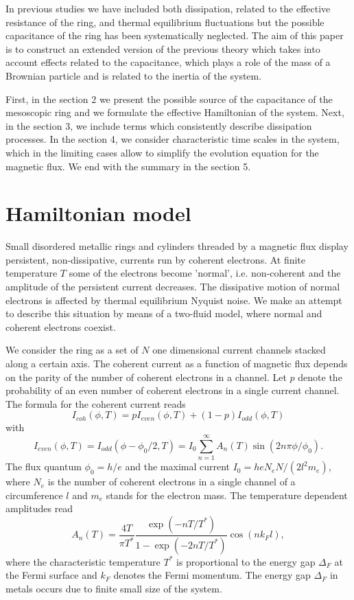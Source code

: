 \documentclass[a4paper,final]{appolb}
\begin{document}
In  previous studies we have included both dissipation, related to the 
effective resistance of 
the ring, and thermal equilibrium  fluctuations but the possible 
capacitance of the ring has been  
systematically neglected. 
The aim of this paper is to construct an extended version of the previous theory which takes into account  effects related to the capacitance, which  
plays a role of the mass of a Brownian particle  
and  is related to the inertia of the system.     

First, in the section 2 we present the possible source of the capacitance 
of the mesoscopic ring and we formulate the effective  Hamiltonian of 
the system.  
Next, in the section 3, we  include terms which consistently describe dissipation processes.  
In the section 4, we consider characteristic time scales in the system, which  in the  limiting 
cases allow to simplify the evolution equation for the magnetic flux.    
We end with the summary in the section 5. 


\section{Hamiltonian model}  

Small disordered metallic rings and cylinders threaded by a magnetic flux 
display persistent, non-dissipative,  currents run by coherent
electrons. At  finite temperature $T$ some of the electrons
become 'normal', i.e. non-coherent and the amplitude of the
persistent current decreases. The
dissipative motion of normal electrons is affected by  thermal
equilibrium Nyquist noise.
We make an attempt to describe this situation by means of a %
two-fluid model, where normal and coherent electrons coexist. 

We consider the ring as a set of $N$ one dimensional 
current channels stacked along a certain axis. The coherent
current as a function of magnetic flux depends on the parity of
the number of coherent electrons in a channel. Let $p$ denote the
probability of an even number of coherent electrons in a single
current channel. The formula for the coherent current reads \cite{cheng}
%
$$ I_{coh}(\phi,T)=pI_{even}(\phi,T)+(1-p)I_{odd}(\phi,T) $$ with
%
$$I_{even}(\phi,T)=I_{odd}(\phi-\phi_0/2,T) =I_0\sum_{n=1}^\infty
A_n(T)\sin ( 2n\pi \phi /\phi _0).$$
%
 The flux quantum
$\phi_0=h/e$ and the maximal current $I_0=heN_eN/(2l^{2}m_e)$, where $N_e$ is the number  of 
coherent
electrons in a single channel of a  circumference $l$ and $m_e$ stands for
the electron mass.  The temperature dependent amplitudes read
%
$$A_n(T)= \frac{4T}{\pi T^*}\frac{\exp(-nT/T^*)}{1-\exp(-2nT/T^*)}
\cos(nk_F l),$$
%
 where the  characteristic temperature $T^*$ is  proportional to the
energy gap $\Delta_F$ at the Fermi surface and $k_F$ denotes the 
Fermi momentum. The energy gap $\Delta_F$ in metals  occurs due to 
finite small size of the system. 
\end{document}
